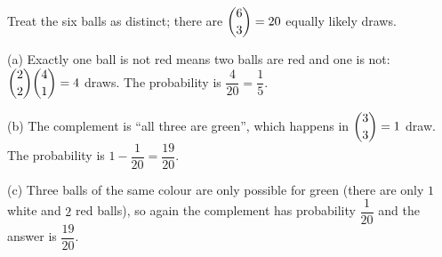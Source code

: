 Treat the six balls as distinct; there are $\dbinom63=20$ equally likely draws.

(a) Exactly one ball is not red means two balls are red and one is not: $\dbinom22\dbinom41=4$ draws. The probability is $\dfrac{4}{20}=\boxed{\dfrac{1}{5}}$.

(b) The complement is ``all three are green'', which happens in $\dbinom33=1$ draw. The probability is $1-\dfrac{1}{20}=\boxed{\dfrac{19}{20}}$.

(c) Three balls of the same colour are only possible for green (there are only $1$ white and $2$ red balls), so again the complement has probability $\dfrac{1}{20}$ and the answer is $\boxed{\dfrac{19}{20}}$.
